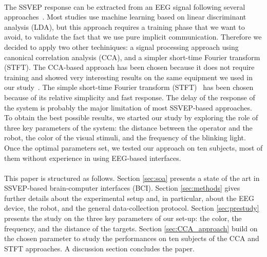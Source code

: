 \documentclass[smallextended]{svjour3}
\begin{document}
\\ 
The SSVEP response can be extracted from an EEG signal following several approaches~\cite{Bi2013}. 
Most studies use machine learning based on linear discriminant analysis (LDA), but this approach requires a training phase that we want to avoid, to validate the fact that we use pure implicit communication.
Therefore we decided to apply two other techiniques: a signal processing approach using canonical correlation analysis (CCA), and a simpler short-time Fourier transform (STFT).
The CCA-based approach has been chosen because it does not require training and showed very interesting results on the same equipment we used in our study~\cite{Lin2014}.
The simple short-time Fourier transform (STFT)~\cite{Durak2003} has been chosen because of its relative simplicity and fast response. The delay of the response of the system is probably the major limitation of most SSVEP-based approaches.\\
To obtain the best possible results, we started our study by exploring the role of three key parameters of the system: the distance between the operator and the robot, the color of the visual stimuli, and the frequency of the blinking light. 
Once the optimal parameters set, we tested our approach on ten subjects, most of them without experience in using EEG-based interfaces. \\
\\
This paper is structured as follows. Section \ref{sec:soa} presents a state of the art in SSVEP-based brain-computer interfaces (BCI). Section \ref{sec:methods} gives further details about the experimental setup and, in particular, about the EEG device, the robot, and the general data-collection protocol. 
Section \ref{sec:prestudy} presents the study on the three key parameters of our set-up: the color, the frequency, and the distance of the targets. Section \ref{sec:CCA_approach} build on the chosen parameter to study the performances on ten subjects of the CCA and STFT approaches. A discussion section concludes the paper.
\end{document}
